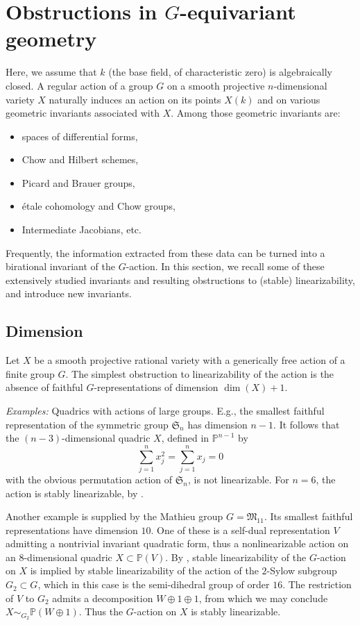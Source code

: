 \documentclass[12pt,reqno]{amsart}
\theoremstyle{plain}
\theoremstyle{remark}
\theoremstyle{definition}
\numberwithin{equation}{section}
\newcommand{\bP}{{\mathbb P}}
\newcommand{\fS}{{\mathfrak S}}
\begin{document}
\section{Obstructions in $G$-equivariant geometry}
\label{sect:obstr}
Here, we assume that $k$ (the base field, of characteristic zero) is algebraically closed.
A regular action of a group $G$ on a smooth projective $n$-dimensional variety $X$ naturally induces an action on its points $X(k)$ and on various geometric invariants associated with $X$. Among those geometric invariants are:
\begin{itemize}
\item spaces of differential forms,
\item Chow and Hilbert schemes,
\item Picard and Brauer groups,
\item \'etale cohomology and Chow groups,
\item Intermediate Jacobians, etc. 
\end{itemize}
Frequently, the information extracted from these data can be turned into a birational invariant of the $G$-action.
In this section, we recall some of these
extensively studied invariants and resulting obstructions to (stable) linearizability, and introduce new invariants.

\subsection{Dimension}
Let $X$ be a smooth projective rational variety with a generically free action of a finite group $G$. 
The simplest obstruction to linearizability 
of the action is the absence of faithful $G$-representations of dimension $\dim(X)+1$. 

\medskip
\noindent
{\em Examples:} Quadrics with actions of large groups. E.g., the smallest faithful representation of the symmetric group $\fS_n$ has dimension $n-1$. It follows that the $(n-3)$-dimensional quadric $X$, defined in $\bP^{n-1}$ by
$$
\sum_{j=1}^n x_j^2 = \sum_{j=1}^n x_j = 0  
$$
with the obvious permutation action of $\fS_n$, is not linearizable.
For $n=6$, the action is stably linearizable, by \cite[Thm.\ 4.1]{CTZ-3}.

Another example is supplied by the Mathieu group $G=\mathfrak M_{11}$. Its smallest faithful representations have dimension $10$. One of these is a self-dual representation $V$ admitting a nontrivial invariant quadratic form, thus a
nonlinearizable action on an $8$-dimensional quadric $X\subset \bP(V)$. 
By \cite[Prop.\ 5.3]{HT-quad}, stable linearizability of the $G$-action on $X$ is implied by stable linearizability of the action of the $2$-Sylow subgroup $G_2\subset G$, which in this case is 
the semi-dihedral group of order $16$. The restriction of $V$ to $G_2$ admits a decomposition $W\oplus 1\oplus 1$, from which we may conclude $X\sim_{G_2}\bP(W\oplus 1)$.
Thus the $G$-action on $X$ is stably linearizable.
\end{document}
